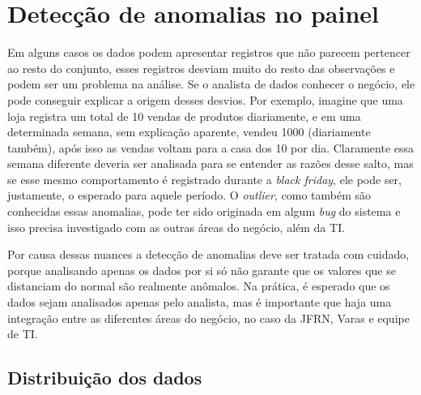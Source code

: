 \chapter{Detecção de anomalias no painel}\label{cap_trabalho_academico}

Em alguns casos os dados podem apresentar registros que não parecem pertencer ao resto do conjunto, esses registros desviam muito do resto das observações e podem ser um problema na análise. Se o analista de dados conhecer o negócio, ele pode conseguir explicar a origem desses desvios. Por exemplo, imagine que uma loja registra um total de 10 vendas de produtos diariamente, e em uma determinada semana, sem explicação aparente, vendeu 1000 (diariamente também), após isso as vendas voltam para a casa dos 10 por dia. Claramente essa semana diferente deveria ser analisada para se entender as razões desse salto, mas se esse mesmo comportamento é registrado durante a \textit{black friday}, ele pode ser, justamente, o esperado para aquele período. O \textit{outlier}, como também são conhecidas essas anomalias, pode ter sido originada em algum \textit{bug} do sistema e isso precisa investigado com as outras áreas do negócio, além da TI.

Por causa dessas nuances a detecção de anomalias deve ser tratada com cuidado, porque analisando apenas os dados por si só não garante que os valores que se distanciam do normal são realmente anômalos. Na prática, é esperado que os dados sejam analisados apenas pelo analista, mas é importante que haja uma integração entre as diferentes áreas do negócio, no caso da JFRN, Varas e equipe de TI. 

\section{Distribuição dos dados}


